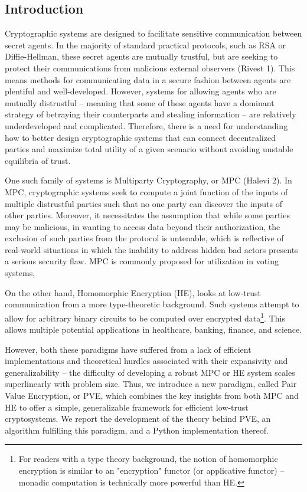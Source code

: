\documentclass{article}
\begin{document}
\begin{multicols}{2}

\section{Introduction}

Cryptographic systems are designed to facilitate sensitive communication between secret agents. In the majority of standard practical protocols, such as RSA or Diffie-Hellman, these secret agents are mutually trustful, but are seeking to protect their communications from malicious external observers (Rivest 1). This means methods for communicating data in a secure fashion between agents are plentiful and well-developed. However, systems for allowing agents who are mutually distrustful – meaning that some of these agents have a dominant strategy of betraying their counterparts and stealing information – are relatively underdeveloped and complicated. Therefore, there is a need for understanding how to better design cryptographic systems that can connect decentralized parties and maximize total utility of a given scenario without avoiding unstable equilibria of trust.

One such family of systems is Multiparty Cryptography, or MPC (Halevi 2). In MPC, cryptographic systems seek to compute a joint function of the inputs of multiple distrustful parties such that no one party can discover the inputs of other parties. Moreover, it necessitates the assumption that while some parties may be malicious, in wanting to access data beyond their authorization, the exclusion of such parties from the protocol is untenable, which is reflective of real-world situations in which the inability to address hidden bad actors presents a serious security flaw. MPC is commonly proposed for utilization in voting systems, 

On the other hand, Homomorphic Encryption (HE), looks at low-trust communication from a more type-theoretic background. Such systems attempt to allow for arbitrary binary circuits to be computed over encrypted data\footnote{For readers with a type theory background, the notion of homomorphic encryption is similar to an "encryption" functor (or applicative functor) – monadic computation is technically more powerful than HE.}. This allows multiple potential applications in healthcare, banking, finance, and science.

However, both these paradigms have suffered from a lack of efficient implementations and theoretical hurdles associated with their expansivity and generalizability – the difficulty of developing a robust MPC or HE system scales superlinearly with problem size. Thus, we introduce a new paradigm, called Pair Value Encryption, or PVE, which combines the key insights from both MPC and HE to offer a simple, generalizable framework for efficient low-trust cryptosystems. We report the development of the theory behind PVE, an algorithm fulfilling this paradigm, and a Python implementation thereof.



\end{multicols}
\end{document}
